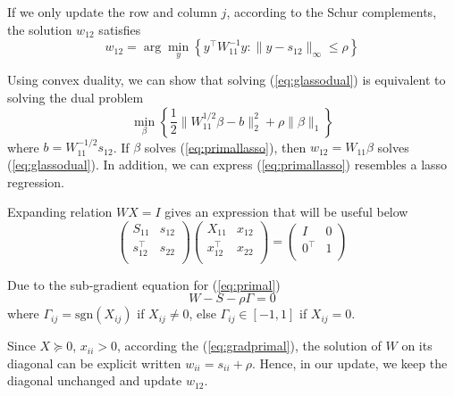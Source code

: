 \documentclass[conference,onecolumn,12pt]{IEEEtran}
\newcommand{\<}{\langle}
\renewcommand{\>}{\rangle}
\newcommand{\sgn}[1]{\textrm{sgn}(#1)}
\numberwithin{equation}{section}
\begin{document}
If we only update the row and column $j$, according to the Schur complements, the solution $w_{12}$ satisfies
\begin{equation}
    w_{12} = \arg\min_{y} \left\{
        y^\top W_{11}^{-1}y:\|y-s_{12}\|_{\infty} \leq \rho
        \right\}
\label{eq:glassodual}
\end{equation}

Using convex duality, we can show that solving (\ref{eq:glassodual})
is equivalent to solving the dual problem
\begin{equation}
    \min_{\beta} \left\{\frac{1}{2}
    \|W_{11}^{1/2}\beta-b\|^2_2 +\rho\|\beta\|_1
    \right\}
    \label{eq:primallasso}
\end{equation}
where $b=W_{11}^{-1/2}s_{12}$. If $\beta$ solves (\ref{eq:primallasso}), then $w_{12}=W_{11}\beta$ solves (\ref{eq:glassodual}). In addition, we can express
(\ref{eq:primallasso}) resembles a lasso regression.

    Expanding relation $WX=I$ gives an expression that will be useful below
    \begin{equation}
       \left(\begin{matrix}
            S_{11}&s_{12}\\
            s_{12}^\top &s_{22}\\
        \end{matrix}\right) \left(\begin{matrix}
            X_{11}&x_{12}\\
            x_{12}^\top &x_{22}\\
        \end{matrix}\right) = \left(\begin{matrix}
            I&0\\
            0^\top &1\\
        \end{matrix}\right)
    \end{equation}

    Due to the sub-gradient equation for (\ref{eq:primal})
    \begin{equation}
        W-S-\rho \Gamma = 0
    \label{eq:gradprimal}
    \end{equation}
    where $\Gamma_{ij} = \sgn{X_{ij}}$ if $X_{ij}\neq 0$, else $\Gamma_{ij} \in [-1,1]$ if $X_{ij} = 0$.

    Since $X\succeq 0$, $x_{ii}>0$, according the (\ref{eq:gradprimal}), the solution of $W$ on its diagonal can be explicit written $w_{ii} = s_{ii}+\rho$. Hence, in our update, we keep the diagonal unchanged and update $w_{12}$. 
\end{document}
